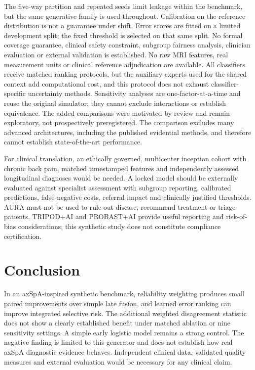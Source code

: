\documentclass[conference]{IEEEtran}
\begin{document}
The five-way partition and repeated seeds limit leakage within the benchmark, but the same generative family is used throughout. Calibration on the reference distribution is not a guarantee under shift. Error scores are fitted on a limited development split; the fixed threshold is selected on that same split. No formal coverage guarantee, clinical safety constraint, subgroup fairness analysis, clinician evaluation or external validation is established. No raw MRI features, real measurement units or clinical reference adjudication are available. All classifiers receive matched ranking protocols, but the auxiliary experts used for the shared context add computational cost, and this protocol does not exhaust classifier-specific uncertainty methods. Sensitivity analyses are one-factor-at-a-time and reuse the original simulator; they cannot exclude interactions or establish equivalence. The added comparisons were motivated by review and remain exploratory, not prospectively preregistered. The comparison excludes many advanced architectures, including the published evidential methods, and therefore cannot establish state-of-the-art performance. 

For clinical translation, an ethically governed, multicenter inception cohort with chronic back pain, matched timestamped features and independently assessed longitudinal diagnoses would be needed. A locked model should be externally evaluated against specialist assessment with subgroup reporting, calibrated predictions, false-negative costs, referral impact and clinically justified thresholds. AURA must not be used to rule out disease, recommend treatment or triage patients. TRIPOD+AI and PROBAST+AI \cite{tripod,probast} provide useful reporting and risk-of-bias considerations; this synthetic study does not constitute compliance certification.
\section{Conclusion}
In an axSpA-inspired synthetic benchmark, reliability weighting produces small paired improvements over simple late fusion, and learned error ranking can improve integrated selective risk. The additional weighted disagreement statistic does not show a clearly established benefit under matched ablation or nine sensitivity settings. A simple early logistic model remains a strong control. The negative finding is limited to this generator and does not establish how real axSpA diagnostic evidence behaves. Independent clinical data, validated quality measures and external evaluation would be necessary for any clinical claim.
\end{document}

